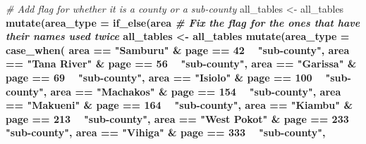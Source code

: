 \documentclass[
]{book}
\newenvironment{Shaded}{\begin{snugshade}}{\end{snugshade}}
\newcommand{\CommentTok}[1]{\textcolor[rgb]{0.56,0.35,0.01}{\textit{#1}}}
\newcommand{\DataTypeTok}[1]{\textcolor[rgb]{0.13,0.29,0.53}{#1}}
\newcommand{\DecValTok}[1]{\textcolor[rgb]{0.00,0.00,0.81}{#1}}
\newcommand{\KeywordTok}[1]{\textcolor[rgb]{0.13,0.29,0.53}{\textbf{#1}}}
\newcommand{\NormalTok}[1]{#1}
\newcommand{\OperatorTok}[1]{\textcolor[rgb]{0.81,0.36,0.00}{\textbf{#1}}}
\newcommand{\StringTok}[1]{\textcolor[rgb]{0.31,0.60,0.02}{#1}}
\begin{document}
\begin{Shaded}
\begin{Highlighting}[]
\CommentTok{# Add flag for whether it is a county or a sub-county}
\NormalTok{all_tables <-}\StringTok{ }
\StringTok{  }\NormalTok{all_tables }\OperatorTok{%
\StringTok{  }\KeywordTok{mutate}\NormalTok{(}\DataTypeTok{area_type =} \KeywordTok{if_else}\NormalTok{(area }\OperatorTok{%
\CommentTok{# Fix the flag for the ones that have their names used twice}
\NormalTok{all_tables <-}\StringTok{ }
\StringTok{  }\NormalTok{all_tables }\OperatorTok{%
\StringTok{  }\KeywordTok{mutate}\NormalTok{(}\DataTypeTok{area_type =} \KeywordTok{case_when}\NormalTok{(}
\NormalTok{    area }\OperatorTok{==}\StringTok{ "Samburu"} \OperatorTok{&}\StringTok{ }\NormalTok{page }\OperatorTok{==}\StringTok{ }\DecValTok{42} \OperatorTok{~}\StringTok{ "sub-county"}\NormalTok{,}
\NormalTok{    area }\OperatorTok{==}\StringTok{ "Tana River"} \OperatorTok{&}\StringTok{ }\NormalTok{page }\OperatorTok{==}\StringTok{ }\DecValTok{56} \OperatorTok{~}\StringTok{ "sub-county"}\NormalTok{,}
\NormalTok{    area }\OperatorTok{==}\StringTok{ "Garissa"} \OperatorTok{&}\StringTok{ }\NormalTok{page }\OperatorTok{==}\StringTok{ }\DecValTok{69} \OperatorTok{~}\StringTok{ "sub-county"}\NormalTok{,}
\NormalTok{    area }\OperatorTok{==}\StringTok{ "Isiolo"} \OperatorTok{&}\StringTok{ }\NormalTok{page }\OperatorTok{==}\StringTok{ }\DecValTok{100} \OperatorTok{~}\StringTok{ "sub-county"}\NormalTok{,}
\NormalTok{    area }\OperatorTok{==}\StringTok{ "Machakos"} \OperatorTok{&}\StringTok{ }\NormalTok{page }\OperatorTok{==}\StringTok{ }\DecValTok{154} \OperatorTok{~}\StringTok{ "sub-county"}\NormalTok{,}
\NormalTok{    area }\OperatorTok{==}\StringTok{ "Makueni"} \OperatorTok{&}\StringTok{ }\NormalTok{page }\OperatorTok{==}\StringTok{ }\DecValTok{164} \OperatorTok{~}\StringTok{ "sub-county"}\NormalTok{,}
\NormalTok{    area }\OperatorTok{==}\StringTok{ "Kiambu"} \OperatorTok{&}\StringTok{ }\NormalTok{page }\OperatorTok{==}\StringTok{ }\DecValTok{213} \OperatorTok{~}\StringTok{ "sub-county"}\NormalTok{,}
\NormalTok{    area }\OperatorTok{==}\StringTok{ "West Pokot"} \OperatorTok{&}\StringTok{ }\NormalTok{page }\OperatorTok{==}\StringTok{ }\DecValTok{233} \OperatorTok{~}\StringTok{ "sub-county"}\NormalTok{,}
\NormalTok{    area }\OperatorTok{==}\StringTok{ "Vihiga"} \OperatorTok{&}\StringTok{ }\NormalTok{page }\OperatorTok{==}\StringTok{ }\DecValTok{333} \OperatorTok{~}\StringTok{ "sub-county"}\NormalTok{,}
}}}
\end{Highlighting}
\end{Shaded}
\end{document}
